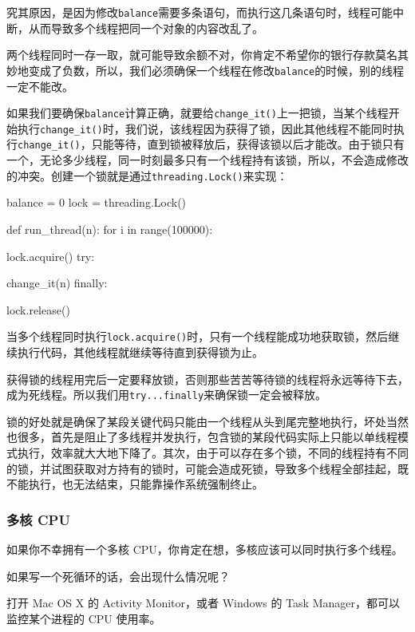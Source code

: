 究其原因，是因为修改\texttt{balance}需要多条语句，而执行这几条语句时，线程可能中断，从而导致多个线程把同一个对象的内容改乱了。

两个线程同时一存一取，就可能导致余额不对，你肯定不希望你的银行存款莫名其妙地变成了负数，所以，我们必须确保一个线程在修改\texttt{balance}的时候，别的线程一定不能改。

如果我们要确保\texttt{balance}计算正确，就要给\texttt{change\_it()}上一把锁，当某个线程开始执行\texttt{change\_it()}时，我们说，该线程因为获得了锁，因此其他线程不能同时执行\texttt{change\_it()}，只能等待，直到锁被释放后，获得该锁以后才能改。由于锁只有一个，无论多少线程，同一时刻最多只有一个线程持有该锁，所以，不会造成修改的冲突。创建一个锁就是通过\texttt{threading.Lock()}来实现：

\begin{pythoncode}
balance = 0
lock = threading.Lock()

def run_thread(n):
    for i in range(100000):
        
        lock.acquire()
        try:
            
            change_it(n)
        finally:
            
            lock.release()
\end{pythoncode}

当多个线程同时执行\texttt{lock.acquire()}时，只有一个线程能成功地获取锁，然后继续执行代码，其他线程就继续等待直到获得锁为止。

获得锁的线程用完后一定要释放锁，否则那些苦苦等待锁的线程将永远等待下去，成为死线程。所以我们用\texttt{try...finally}来确保锁一定会被释放。

锁的好处就是确保了某段关键代码只能由一个线程从头到尾完整地执行，坏处当然也很多，首先是阻止了多线程并发执行，包含锁的某段代码实际上只能以单线程模式执行，效率就大大地下降了。其次，由于可以存在多个锁，不同的线程持有不同的锁，并试图获取对方持有的锁时，可能会造成死锁，导致多个线程全部挂起，既不能执行，也无法结束，只能靠操作系统强制终止。

\hypertarget{ux591aux6838-cpu}{%
\subsubsection{多核 CPU}\label{ux591aux6838-cpu}}

如果你不幸拥有一个多核 CPU，你肯定在想，多核应该可以同时执行多个线程。

如果写一个死循环的话，会出现什么情况呢？

打开 Mac OS X 的 Activity Monitor，或者 Windows 的 Task
Manager，都可以监控某个进程的 CPU 使用率。

